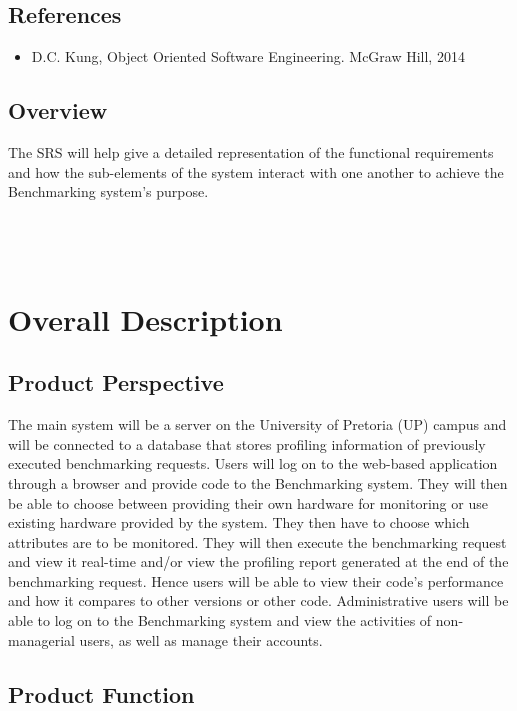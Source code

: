 \documentclass{article}
\begin{document}
	\subsection{References}
        	\begin{itemize}
        		\item D.C. Kung, Object Oriented Software Engineering. McGraw Hill, 2014
        	\end{itemize}
	\subsection{Overview}
	The SRS will help give a detailed representation of the functional requirements and how the sub-elements of the system interact with one another to achieve the Benchmarking system's purpose.\\\\\\\\

	\section{Overall Description}
    	
	\subsection{Product Perspective}
    The main system will be a server on the University of Pretoria (UP) campus and will be connected to a database that stores profiling information of previously executed benchmarking requests. Users will log on to the web-based application through a browser and provide code to the Benchmarking system. They will then be able to choose between providing their own hardware for monitoring or use existing hardware provided by the system. They then have to choose which attributes are to be monitored. They will then execute the benchmarking request and view it real-time and/or view the profiling report generated at the end of the benchmarking request. Hence users will be able to view their code's performance and how it compares to other versions or other code. Administrative users will be able to log on to the Benchmarking system and view the activities of non-managerial users, as well as manage their accounts.   
	\subsection{Product Function}
    
\end{document}
